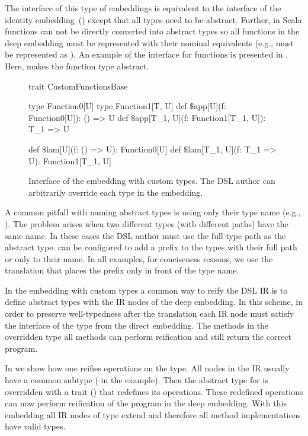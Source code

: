 The interface of this type of embeddings is equivalent to the interface of the identity embedding~() except that all types need to be abstract. Further, in Scala functions can not be directly
converted into abstract types so all functions in the deep embedding must be represented
with their nominal equivalents (e.g.,  must be represented as ).
An example of the interface for functions is presented in . Here,  makes
the function type abstract.

\begin{figure}
\begin{listingtiny}
trait CustomFunctionsBase {
  type Function0[U]
  type Function1[T, U]
  def $\$$app[U](f: Function0[U]): () => U
  def $\$$app[T_1, U](f: Function1[T_1, U]): T_1 => U

  def $\$$lam[U](f: () => U): Function0[U]
  def $\$$lam[T_1, U](f: T_1 => U): Function1[T_1, U]
}
\end{listingtiny}
\caption{Interface of the embedding with custom types. The DSL author can arbitrarily override each type in the embedding.}
\label{fig:custom-types}
\end{figure}

A common pitfall with naming abstract types is using only their type name (e.g., ).
 The problem arises when two different types (with different paths) have the same name. In these cases
 the DSL author must use the full type path as the abstract type. \yy can be configured to
 add a prefix to the types with their full path or only to their name. In all examples, for conciseness reasons,
 we use the translation that places the prefix only in front of the type name.

In the embedding with custom types a common way to reify the DSL IR is to
define abstract types with the IR nodes of the deep embedding. In this scheme, in order
to preserve well-typedness after the translation each IR node must satisfy the interface
of the type from the direct embedding. The methods in the overridden type all methods
can perform reification and still return the correct program.

In  we show how one reifies operations on the  type.
All nodes in the IR usually have a common subtype ( in the example). Then the
abstract type for  is overridden with a trait  () that redefines
its operations. These redefined operations can now perform reification of the program in the
deep embedding. With this embedding all IR nodes of type  extend 
and therefore all method implementations have valid types.

